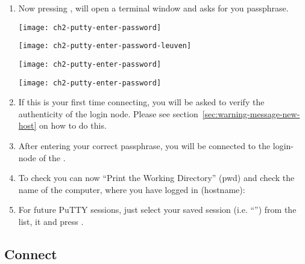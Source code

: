 \begin{enumerate}
    \item  Now pressing , will open a terminal window and
      asks for you passphrase.

\ifantwerpen
      \begin{center}
      \texttt{[image: ch2-putty-enter-password]}
      \end{center}
\fi
\ifleuven
      \begin{center}
      \texttt{[image: ch2-putty-enter-password-leuven]}
      \end{center}
\fi
\ifbrussel
      \begin{center}
      \texttt{[image: ch2-putty-enter-password]}
      \end{center}
\fi
\ifgent
      \begin{center}
      \texttt{[image: ch2-putty-enter-password]}
      \end{center}
\fi

    \item If this is your first time connecting, you will be asked to verify the authenticity of
        the login node. Please see section~\ref{sec:warning-message-new-host} on how to do this.

    \item  After entering your correct passphrase, you will be connected to the
      login-node of the \hpc.
    \item  To check you can now ``Print the Working Directory'' (pwd) and check
      the name of the computer, where you have logged in (hostname):

\begin{prompt}
\end{prompt}

    \item  For future PuTTY sessions, just select your saved session (i.e.
      ``\emph{\hpcname}'') from the list,  it and press
      .
  \end{enumerate}

\fi

\ifmacORlinux

  \subsection{Connect}
  \label{sec:connect}


